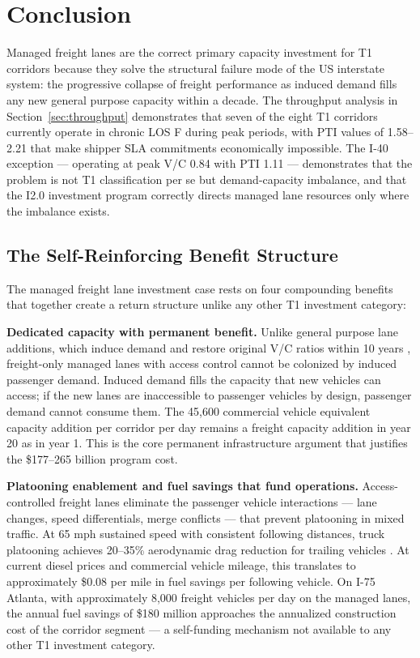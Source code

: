\section{Conclusion}

Managed freight lanes are the correct primary capacity investment for T1 corridors because they solve the structural failure mode of the US interstate system: the progressive collapse of freight performance as induced demand fills any new general purpose capacity within a decade. The throughput analysis in Section~\ref{sec:throughput} demonstrates that seven of the eight T1 corridors currently operate in chronic LOS F during peak periods, with PTI values of 1.58--2.21 that make shipper SLA commitments economically impossible. The I-40 exception --- operating at peak V/C 0.84 with PTI 1.11 --- demonstrates that the problem is not T1 classification per se but demand-capacity imbalance, and that the I2.0 investment program correctly directs managed lane resources only where the imbalance exists.

\subsection*{The Self-Reinforcing Benefit Structure}

The managed freight lane investment case rests on four compounding benefits that together create a return structure unlike any other T1 investment category:

\textbf{Dedicated capacity with permanent benefit.} Unlike general purpose lane additions, which induce demand and restore original V/C ratios within 10 years \citep{Duranton2011}, freight-only managed lanes with access control cannot be colonized by induced passenger demand. Induced demand fills the capacity that new vehicles can access; if the new lanes are inaccessible to passenger vehicles by design, passenger demand cannot consume them. The 45,600 commercial vehicle equivalent capacity addition per corridor per day remains a freight capacity addition in year 20 as in year 1. This is the core permanent infrastructure argument that justifies the \$177--265 billion program cost.

\textbf{Platooning enablement and fuel savings that fund operations.} Access-controlled freight lanes eliminate the passenger vehicle interactions --- lane changes, speed differentials, merge conflicts --- that prevent platooning in mixed traffic. At 65 mph sustained speed with consistent following distances, truck platooning achieves 20--35\% aerodynamic drag reduction for trailing vehicles \citep{Browand2004}. At current diesel prices and commercial vehicle mileage, this translates to approximately \$0.08 per mile in fuel savings per following vehicle. On I-75 Atlanta, with approximately 8,000 freight vehicles per day on the managed lanes, the annual fuel savings of \$180 million approaches the annualized construction cost of the corridor segment --- a self-funding mechanism not available to any other T1 investment category.

